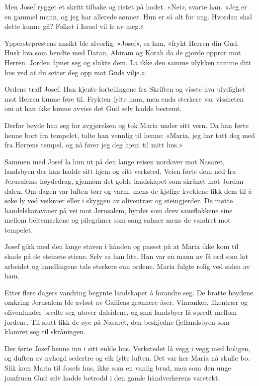 Men Josef rygget et skritt tilbake og ristet på hodet.
«Nei», svarte han. «Jeg er en gammel mann, og jeg har allerede sønner.
Hun er så alt for ung. Hvordan skal dette kunne gå?
Folket i Israel vil le av meg.»

Yppersteprestens ansikt ble alvorlig.
«Josef», sa han, «frykt Herren din Gud. Husk hva som hendte med
Datan, Abiram og Korah da de gjorde opprør mot Herren.
Jorden åpnet seg og slukte dem. La ikke den samme ulykken ramme
ditt hus ved at du setter deg opp mot Guds vilje.»

Ordene traff Josef. Han kjente fortellingene fra
Skriften og visste hva ulydighet mot Herren kunne føre til.
Frykten fylte ham, men enda sterkere var
vissheten om at han ikke kunne avvise det Gud selv hadde bestemt.

Derfor bøyde han seg for avgjørelsen og tok Maria under sitt vern.
Da han førte henne bort fra tempelet, talte han vennlig til henne:
«Maria, jeg har tatt deg med fra Herrens tempel, og nå fører jeg
deg hjem til mitt hus.»


Sammen med Josef la hun ut på den lange reisen nordover mot Nasaret,
landsbyen der han hadde sitt hjem og sitt verksted.
Veien førte dem ned fra Jerusalems høydedrag,
gjennom det golde landskapet som skrånet mot Jordan-dalen.
Om dagen var luften tørr og varm, mens de kjølige kveldene
fikk dem til å søke ly ved veikroer eller i skyggen av
oliventrær og steingjerder. De møtte handelskaravaner
på vei mot Jerusalem, hyrder som drev saueflokkene
sine mellom beitemarkene og pilegrimer som sang
salmer mens de vandret mot tempelet.

Josef gikk med den lange staven i hånden og passet på at
Maria ikke kom til skade på de steinete stiene.
Selv sa han lite. Han var en mann av få ord
som lot arbeidet og handlingene tale sterkere enn ordene.
Maria fulgte rolig ved siden av ham. 

Etter flere dagers vandring begynte landskapet å forandre seg.
De bratte høydene omkring Jerusalem ble avløst av
Galileas grønnere åser. Vinranker, fikentrær og
olivenlunder bredte seg utover dalsidene, og
små landsbyer lå spredt mellom jordene.
Til slutt fikk de øye på Nasaret, den beskjedne
fjellandsbyen som klamret seg til skråningen.

Der førte Josef henne inn i sitt enkle hus.
Verkstedet lå vegg i vegg med boligen, og duften av nyhogd
sedertre og eik fylte luften. Det var her Maria nå skulle bo.
Slik kom Maria til Josefs hus, ikke som en vanlig brud,
men som den unge jomfruen Gud selv hadde betrodd i den gamle
håndverkerens varetekt.


